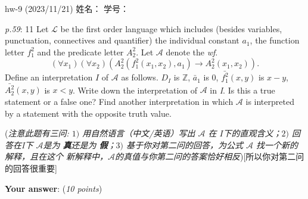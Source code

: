 \documentclass[UTF8,12pt,a4paper]{ctexart}
\begin{document}
	

\begin{center}
hw-9 (2023/11/21) \qquad\qquad 姓名：  \hspace{7em}  学号： 
\end{center}

\emph{p.59}: 11 \quad
Let $\mathscr{L}$ be the first order language which includes (besides variables, punctuation, connectives and quantifier) the individual constant $a_1$, the function letter $f^2_1$ and the predicate letter $A^2_2$. Let $\mathscr{A}$ denote the \textit{wf}.
\[
(\forall x_1)(\forall x_2)( A^2_2 ( f^2_1(x_1,x_2), a_1)  \to A^2_2 (x_1,x_2) ).
\]
Define an interpretation $I$ of $\mathscr{A}$ as follows. 
$D_I$ is $\mathbb{Z}$, $\bar{a}_1$ is $0$, $\bar{f^2_1} (x, y)$ is $x-y$, 
$\bar{A^2_2}(x,y)$ is $x < y$. 
Write down the interpretation of $\mathscr{A}$ in \textit{I}. 
Is this a true statement or a false one? 
Find another interpretation in which $\mathscr{A}$ is interpreted by a statement with the opposite truth value.


(\textit{注意此题有三问: $1)$ 用自然语言（中文/英语）写出 $\mathscr{A}$ 在 $I$下的直观含义；$2)$ 回答在\textit{I}下 $\mathscr{A}$是为\textbf{{\color{purple} 真}}还是为\textbf{{\color{purple} 假}}；$3)$ 基于你对第二问的回答，为公式 $\mathscr{A}$ 找一个新的解释，且在这个{\color{purple} 新}解释中，$\mathscr{A}$的真值与你第二问的答案恰好相反})[所以你对第二问的回答很重要]

\textbf{Your answer}:   \hfill (\textit{10 points})


























\end{document}

